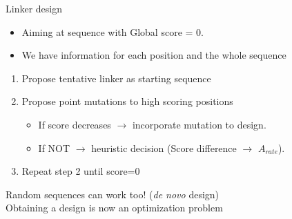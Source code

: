 \documentclass{beamer}
\begin{document}
\begin{frame}{Linker design}
\begin{itemize}
 \item Aiming at sequence with Global score = 0.
 \pause
 \item We have information for each position and the whole sequence
\pause
\end{itemize}


\begin{enumerate}
 \item Propose tentative linker as starting sequence 
  \pause
 \item Propose point mutations to high scoring positions
      \begin{itemize}
      \item If score decreases $\rightarrow$ incorporate mutation to design.
      \item If NOT $\rightarrow$ heuristic decision (Score difference $\rightarrow$  $A_{rate}$).
     \end{itemize}
 \item Repeat step 2 until score=0
\end{enumerate}

\pause
Random sequences can work too! (\textit{de novo} design)\\
\pause
Obtaining a design is now an optimization problem




\end{frame}
\end{document}
